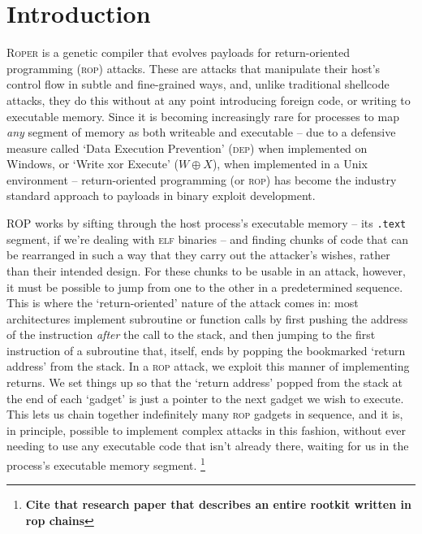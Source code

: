 %
\section{Introduction}

\textsc{Roper} is a genetic compiler that evolves payloads for
return-oriented programming (\textsc{rop}) attacks. These are
attacks that manipulate their host's control flow in subtle and
fine-grained ways, and, unlike traditional shellcode attacks,
they do this without at any point introducing foreign code,
or writing to executable memory. Since it is becoming
increasingly rare for processes to map \emph{any} segment of
memory as both writeable and executable -- due to a defensive
measure called `Data Execution Prevention' (\textsc{dep}) when
implemented on Windows, or `Write xor Execute'
($W \oplus X$), when implemented in a Unix environment --
return-oriented programming (or \textsc{rop}) has become the
industry standard approach to payloads in binary exploit
development. 

ROP works by sifting through the host process's executable memory
-- its \texttt{.text} segment, if we're dealing with
\textsc{elf} binaries -- and finding chunks of code that can be
rearranged in such a way that they carry out the attacker's
wishes, rather than their intended design. For these chunks to be
usable in an attack, however, it must be possible to jump from
one to the other in a predetermined sequence. This is where the
`return-oriented' nature of the attack comes in: most
architectures implement subroutine or function calls by first
pushing the address of the instruction \emph{after} the call to
the stack, and then jumping to the first instruction of a
subroutine that, itself, ends by popping the bookmarked `return
address' from the stack. In a \textsc{rop} attack, we exploit
this manner of implementing returns. We set things up so that
the `return address' popped from the stack at the end of each
`gadget' is just a pointer to the next gadget we wish to execute.
This lets us chain together indefinitely many \textsc{rop}
gadgets in sequence, and it is, in principle, possible to
implement complex attacks in this fashion, without ever needing
to use any executable code that isn't already there, waiting for
us in the process's executable memory segment.%
\footnote{\textbf{Cite that research paper that describes an
  entire rootkit written in rop chains}}

